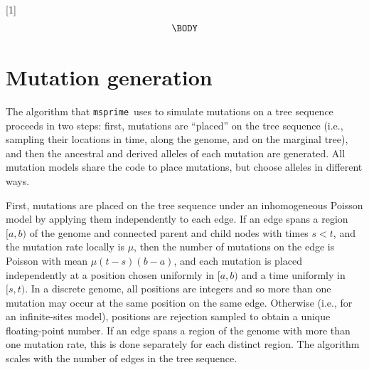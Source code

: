 \documentclass{article}
\newcommand{\msprime}[0]{\texttt{msprime}}
\begin{document}




 \newcommand{\be}{\begin{equation}}
 \newcommand{\ee}{\end{equation}}
 \newcommand{\bd}{\begin{displaymath}}
 \newcommand{\ed}{\end{displaymath}}
\newcommand{\IN}{\ensuremath{\mathds{N}}}%
\newcommand{\EE}[1]{\ensuremath{\mathds{E}\left[ #1 \right]}}%
\newcommand{\one}[1]{\ensuremath{\mathds{1}_{\left\{ #1 \right\}}}}%
\newcommand{\prb}[1]{\ensuremath{\mathds{P}\left( #1 \right) } }%

[1]{%
\begin{equation}
\label{#1}
\begin{split}
  \BODY
\end{split}\end{equation}
}

\setcounter{secnumdepth}{2} %

\appendix

\section*{Mutation generation}
\label{app-mutation-algorithm}

The algorithm that \msprime\ uses to simulate mutations on a tree sequence
proceeds in two steps:
first, mutations are ``placed'' on the tree sequence
(i.e., sampling their locations in time, along the genome, and on the marginal tree),
and then the ancestral and derived alleles of each mutation are generated.
All mutation models share the code to place mutations,
but choose alleles in different ways.

First, mutations are placed on the tree sequence under an inhomogeneous Poisson model
by applying them independently to each edge.
If an edge spans a region $[a, b)$ of the genome
and connected parent and child nodes with times $s < t$,
and the mutation rate locally is $\mu$,
then the number of mutations on the edge is Poisson with mean $\mu (t-s) (b-a)$,
and each mutation is placed independently at a position chosen uniformly in $[a,b)$
and a time uniformly in $[s,t)$.
In a discrete genome, all positions are integers and so more than one mutation
may occur at the same position on the same edge.
Otherwise (i.e., for an infinite-sites model),
positions are rejection sampled to obtain a unique floating-point number.
If an edge spans a region of the genome with more than one mutation rate,
this is done separately for each distinct region.
The algorithm scales with the number of edges in the tree sequence.
\end{document}
